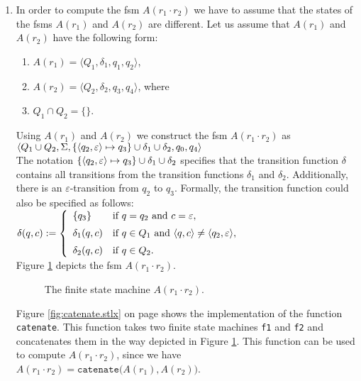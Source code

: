 \begin{enumerate}
\item In order to compute the fsm $A(r_1 \cdot r_2)$ 
      we have to assume that the states of the fsms
      $A(r_1)$ and $A(r_2)$ are different.  
      Let us assume that  $A(r_1)$ and $A(r_2)$ have the following form:
      \begin{enumerate}
      \item $A(r_1) = \langle Q_1, \delta_1, q_1, q_2 \rangle$,
      \item $A(r_2) = \langle Q_2, \delta_2, q_3, q_4 \rangle$, \quad where
      \item $Q_1 \cap Q_2 = \{\}$.
      \end{enumerate}
      Using $A(r_1)$ and $A(r_2)$ we construct the fsm $A(r_1 \cdot r_2)$ as
      \\[0.2cm]
      \hspace*{0.8cm}
       $\langle Q_1 \cup Q_2, \Sigma, 
                \{ \pair(q_2,\varepsilon) \mapsto q_3 \} 
                   \cup \delta_1 \cup \delta_2, q_0, q_4 \rangle$
      \\[0.2cm]
      The notation $\{ \pair(q_2,\varepsilon) \mapsto q_3 \} \cup \delta_1 \cup \delta_2$
      specifies that the transition function $\delta$ contains all transitions
      from the transition functions  $\delta_1$ and $\delta_2$.  Additionally,
      there is an  $\varepsilon$-transition from $q_2$ to
      $q_3$.  Formally, the transition function could also be specified as follows:
      \\[0.2cm]
      \hspace*{1.3cm}
      $\delta(q,c) := \left\{
      \begin{array}{ll}
        \{ q_3 \}       & \mbox{if $q = q_2$ and $c = \varepsilon$}, \\[0.2cm]
        \delta_1(q, c)  & \mbox{if $q \in Q_1$ and $\pair(q,c) \not= \pair(q_2,\varepsilon)$}, \\[0.2cm]
        \delta_2(q, c)  & \mbox{if $q \in Q_2$.} 
      \end{array}\right.
      $
      \\[0.2cm]
      Figure \ref{fig:aConcat.eps} depicts the fsm $A(r_1 \cdot r_2)$.
      
      \begin{figure}[!ht]
        \centering
      \caption{The finite state machine $A(r_1 \cdot r_2)$.}
      \label{fig:aConcat.eps}
      \end{figure}

      Figure \ref{fig:catenate.stlx} on page \pageref{fig:catenate.stlx} shows the
      implementation of the function \texttt{catenate}.  This function takes two
      finite state machines \texttt{f1} and \texttt{f2} and concatenates them in the way
      depicted in Figure \ref{fig:aConcat.eps}.  This function can be used
      to compute $A(r_1 \cdot r_2)$, since we have
      \\[0.2cm]
      \hspace*{1.3cm}
      $A(r_1 \cdot r_2) = \mathtt{catenate}\bigl(A(r_1), A(r_2)\bigr)$.


\end{enumerate}
